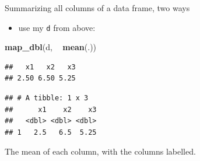 \documentclass[
  ignorenonframetext,
]{beamer}
\newenvironment{Shaded}{\begin{snugshade}}{\end{snugshade}}
\newcommand{\KeywordTok}[1]{\textcolor[rgb]{0.13,0.29,0.53}{\textbf{#1}}}
\newcommand{\NormalTok}[1]{#1}
\newcommand{\OperatorTok}[1]{\textcolor[rgb]{0.81,0.36,0.00}{\textbf{#1}}}
\newcommand{\StringTok}[1]{\textcolor[rgb]{0.31,0.60,0.02}{#1}}
\providecommand{\tightlist}{%
  \setlength{\itemsep}{0pt}\setlength{\parskip}{0pt}}
\begin{document}
\begin{frame}[fragile]{Summarizing all columns of a data frame, two
ways}
\protect\hypertarget{summarizing-all-columns-of-a-data-frame-two-ways}{}

\begin{itemize}
\tightlist
\item
  use my \texttt{d} from above:
\end{itemize}

\begin{Shaded}
\begin{Highlighting}[]
\KeywordTok{map_dbl}\NormalTok{(d, }\OperatorTok{~}\StringTok{ }\KeywordTok{mean}\NormalTok{(.))}
\end{Highlighting}
\end{Shaded}

\begin{verbatim}
##   x1   x2   x3 
## 2.50 6.50 5.25
\end{verbatim}

\begin{Shaded}
\end{Shaded}

\begin{verbatim}
## # A tibble: 1 x 3
##      x1    x2    x3
##   <dbl> <dbl> <dbl>
## 1   2.5   6.5  5.25
\end{verbatim}

The mean of each column, with the columns labelled.

\end{frame}
\end{document}
